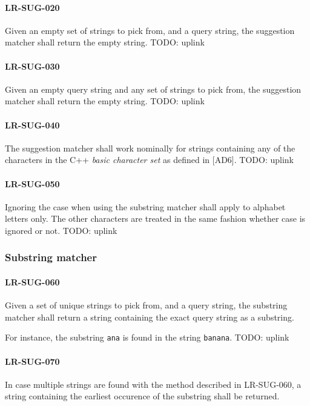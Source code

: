 \paragraph{LR-SUG-020}
Given an empty set of strings to pick from, and a query string,
the suggestion matcher shall return the empty string.
TODO: uplink

\paragraph{LR-SUG-030}
Given an empty query string and any set of strings to pick from,
the suggestion matcher shall return the empty string.
TODO: uplink

\paragraph{LR-SUG-040}
The suggestion matcher shall work nominally for strings containing
any of the characters in the C++ \emph{basic character set} as
defined in [AD6].
TODO: uplink

\paragraph{LR-SUG-050}
Ignoring the case when using the substring matcher shall apply
to alphabet letters only. The other characters are treated
in the same fashion whether case is ignored or not.
TODO: uplink

\subsubsection{Substring matcher}
\paragraph{LR-SUG-060}
Given a set of unique strings to pick from, and a query string,
the substring matcher shall return a string containing the
exact query string as a substring.

For instance, the substring \lstinline{ana} is found in
the string \lstinline{banana}.
TODO: uplink

\paragraph{LR-SUG-070}
In case multiple strings are found with the method described
in LR-SUG-060, a string containing the earliest occurence
of the substring shall be returned.

